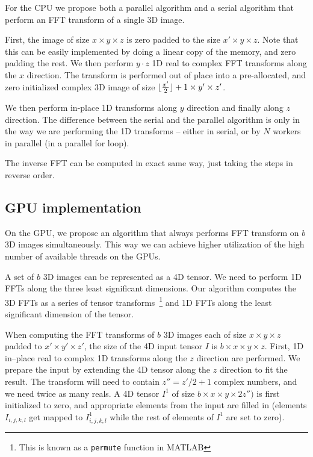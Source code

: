 \documentclass[conference]{IEEEtran}
\DeclarePairedDelimiter{\floor}{\lfloor}{\rfloor}
\begin{document}
  For the CPU we propose both a parallel algorithm and a serial
  algorithm that perform an FFT transform of a single 3D image.

  First, the image of size $x \times y \times z$ is zero padded to the
  size $x' \times y \times z$.  Note that this can be easily
  implemented by doing a linear copy of the memory, and zero padding
  the rest. We then perform $y \cdot z$ 1D real to complex FFT
  transforms along the $x$ direction.  The transform is performed out
  of place into a pre-allocated, and zero initialized complex 3D image
  of size $\floor{\frac{x'}{2}} + 1 \times y' \times z'$.

  We then perform in-place 1D transforms along $y$ direction and
  finally along $z$ direction.  The difference between the serial and
  the parallel algorithm is only in the way we are performing the 1D
  transforms -- either in serial, or by $N$ workers in parallel (in a
  parallel for loop).

  The inverse FFT can be computed in exact same way, just taking the
  steps in reverse order.

\subsection{GPU implementation}

\label{sec:gpu-fft-impl}

  On the GPU, we propose an algorithm that always performs FFT
  transform on $b$ 3D images simultaneously.  This way we can achieve
  higher utilization of the high number of available threads on the
  GPUs.

  A set of $b$ 3D images can be represented as a 4D tensor.  We need
  to perform 1D FFTs along the three least significant dimensions.
  Our algorithm computes the 3D FFTs as a series of tensor
  transforms~\footnote{This is known as a \texttt{permute} function in
    MATLAB} and 1D FFTs along the least significant dimension of the
  tensor.

  When computing the FFT transforms of $b$ 3D images each of size $x
  \times y \times z$ padded to $x' \times y' \times z'$, the size of
  the 4D input tensor $I$ is $b \times x \times y \times z$.  First,
  1D in--place real to complex 1D transforms along the $z$ direction
  are performed. We prepare the input by extending the 4D tensor along
  the $z$ direction to fit the result.  The transform will need to
  contain $z'' = z' / 2 + 1$ complex numbers, and we need twice as
  many reals.  A 4D tensor $I^1$ of size $b \times x \times y \times
  2z'')$ is first initialized to zero, and appropriate elements from
  the input are filled in (elements $I_{i,j,k,l}$ get mapped to
  $I^1_{i,j,k,l}$ while the rest of elements of $I^1$ are set to
  zero).
\end{document}
